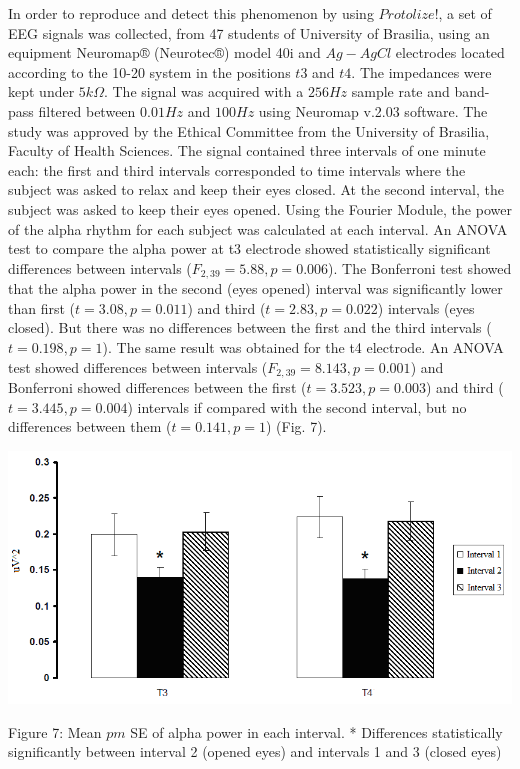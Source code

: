 \documentclass[12pt, a4paper]{article}
\begin{document}
In order to reproduce and detect this phenomenon by using $Protolize!$, a set of EEG signals was collected, from 47 students of University of Brasilia, using an equipment Neuromap® (Neurotec®) model 40i and $Ag-AgCl$ electrodes located according to the 10-20 system in the positions $t3$ and $t4$. The impedances were kept under $5k\Omega$. The signal was acquired with a $256 Hz$ sample rate and band-pass filtered between $0.01 Hz$ and $100 Hz$ using Neuromap v.2.03 software. The study was approved by the Ethical Committee from the University of Brasilia, Faculty of Health Sciences. The signal contained three intervals of one minute each: the first and third intervals corresponded to time intervals where the subject was asked to relax and keep their eyes closed. At the second interval, the subject was asked to keep their eyes opened. Using the Fourier Module, the power of the alpha rhythm for each subject was calculated at each interval.  An ANOVA test to compare the alpha power at t3 electrode showed statistically significant differences between intervals ($F_{2,39}=5.88, p=0.006$). The Bonferroni test showed that the alpha power in the second (eyes opened) interval was significantly lower than first ($t=3.08, p=0.011$) and third ($t=2.83, p=0.022$) intervals (eyes closed). But there was no differences between the first and the third intervals ($t=0.198, p=1$). The same result was obtained for the t4 electrode. An ANOVA test showed differences between intervals ($F_{2,39}=8.143, p=0.001$) and Bonferroni showed differences between the first  ($t=3.523, p=0.003$) and third ($t=3.445, p=0.004$) intervals if compared with the second interval, but no differences between them ($t=0.141, p=1$) (Fig. 7).
\begin{center}
\includegraphics{image007.png}

Figure 7: Mean $pm$ SE of alpha power in each interval. * Differences statistically significantly between interval 2 (opened eyes) and intervals 1 and 3 (closed eyes)
\end{center}
\end{document}

